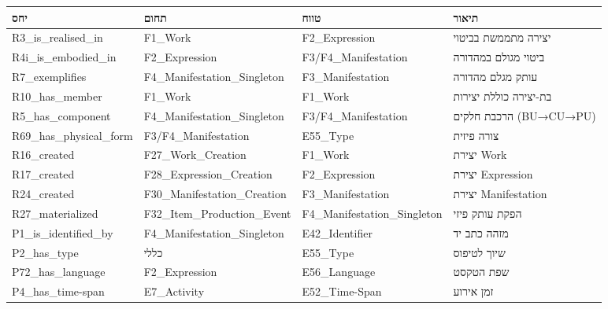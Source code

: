 {\small
\begin{longtable}{|p{4cm}|p{3.5cm}|p{3.5cm}|p{4.5cm}|}
\hline
\textbf{יחס} & \textbf{תחום} & \textbf{טווח} & \textbf{תיאור} \\
\hline
\endhead

\textenglish{R3\_is\_realised\_in} & \textenglish{F1\_Work} & \textenglish{F2\_Expression} & יצירה מתממשת בביטוי \\
\hline
\textenglish{R4i\_is\_embodied\_in} & \textenglish{F2\_Expression} & \textenglish{F3/F4\_Manifestation} & ביטוי מגולם במהדורה \\
\hline
\textenglish{R7\_exemplifies} & \textenglish{F4\_Manifestation\_Singleton} & \textenglish{F3\_Manifestation} & עותק מגלם מהדורה \\
\hline
\textenglish{R10\_has\_member} & \textenglish{F1\_Work} & \textenglish{F1\_Work} & בת-יצירה כוללת יצירות \\
\hline
\textenglish{R5\_has\_component} & \textenglish{F4\_Manifestation\_Singleton} & \textenglish{F3/F4\_Manifestation} & הרכבת חלקים \textenglish{(BU→CU→PU)} \\
\hline
\textenglish{R69\_has\_physical\_form} & \textenglish{F3/F4\_Manifestation} & \textenglish{E55\_Type} & צורה פיזית \\
\hline
\textenglish{R16\_created} & \textenglish{F27\_Work\_Creation} & \textenglish{F1\_Work} & יצירת \textenglish{Work} \\
\hline
\textenglish{R17\_created} & \textenglish{F28\_Expression\_Creation} & \textenglish{F2\_Expression} & יצירת \textenglish{Expression} \\
\hline
\textenglish{R24\_created} & \textenglish{F30\_Manifestation\_Creation} & \textenglish{F3\_Manifestation} & יצירת \textenglish{Manifestation} \\
\hline
\textenglish{R27\_materialized} & \textenglish{F32\_Item\_Production\_Event} & \textenglish{F4\_Manifestation\_Singleton} & הפקת עותק פיזי \\
\hline
\textenglish{P1\_is\_identified\_by} & \textenglish{F4\_Manifestation\_Singleton} & \textenglish{E42\_Identifier} & מזהה כתב יד \\
\hline
\textenglish{P2\_has\_type} & כללי & \textenglish{E55\_Type} & שיוך לטיפוס \\
\hline
\textenglish{P72\_has\_language} & \textenglish{F2\_Expression} & \textenglish{E56\_Language} & שפת הטקסט \\
\hline
\textenglish{P4\_has\_time-span} & \textenglish{E7\_Activity} & \textenglish{E52\_Time-Span} & זמן אירוע \\

\end{longtable}}

